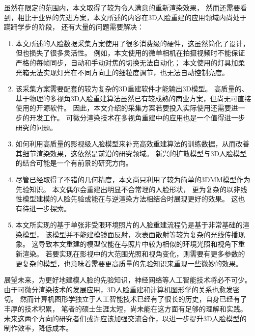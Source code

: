 \documentclass{scutmaster}
\begin{document}
{虽然在限定的范围内，本文取得了较为令人满意的重新渲染效果，
然而还需要看到，相比于业界的先进方案，本文所述的内容在3D人脸重建的应用领域内尚处于蹒跚学步的阶段，
还有大量的问题需要解决：
\begin{enumerate}
\item 本文所述的人脸数据采集方案使用了很多消费级的硬件，这虽然简化了设计，但也损失了很多灵活性。
例如，本文使用的微单相机在拍摄视频时不能保证严格的每帧同步，自动和手动对焦的切换无法自动化；
本文使用的灯具加柔光箱无法实现灯光在不同方向上的细粒度调节，也无法自动控制亮度。
\item 该采集方案需要配套的较为复杂的3D重建软件才能输出3D模型。
高质量的、基于物理的多视角3D人脸重建算法虽然已有较成熟的商业方案，但尚无可直接使用的开源软件。
因此，本文介绍的采集方案若要投入实际使用还需要进一步的开发工作。
可微分渲染技术在多视角重建中的应用也是一个值得进一步研究的问题。
\item 如何利用高质量的影视级人脸模型来补充高效重建算法的训练数据，从而改善其细节渲染效果，这依然是前沿的研究领域。
新兴的扩散模型与3D人脸模型的结合可能是一个有前景的研究方向。
\item 尽管已经取得了不错的几何精度，本文尚只利用了较为简单的3DMM模型作为先验知识。
本文偶尔会重建出明显不合常理的人脸形状，
更为复杂的以非线性模型建模的人脸先验或能在与逆渲染方法相结合时展现更好的效果。
这也有待进一步探索。
\item 本文所实现的基于单张非受限环境照片的人脸重建流程仍是基于非常基础的渲染模型，
该模型并不能建模镜面反射，次表面散射等较为复杂的光线传播现象。
这导致本文重建的模型仅能在与照片中较为相似的环境光照和视角下重新渲染。
若要实现在影视中的大范围光照和视角变化，则需要有更多参数的更复杂的模型，也意味着需要更高质量的先验知识来重现一些微妙的效果。
\end{enumerate}

展望未来，为更好地建模人脸的先验知识，神经网络等人工智能技术将必不可少。
由于可微分渲染技术的发展应用，3D人脸重建和计算机图形学的关系也愈发密切。
然而计算机图形学独立于人工智能技术已经有了很长的历史，自身已经有了丰厚的技术积累，
笔者的硕士生涯太短，尚未能在这方面有足够的理解和实践。
未来这两个方向的研究者们或许应该加强交流合作，以进一步提升3D人脸模型的制作效率，降低成本。




}
\end{document}
